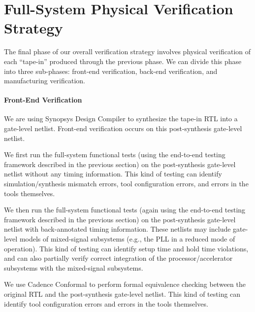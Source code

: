 
\section{Full-System Physical Verification Strategy}

The final phase of our overall verification strategy involves physical
verification of each ``tape-in'' produced through the previous phase. We
can divide this phase into three sub-phases: front-end verification,
back-end verification, and manufacturing verification.

\smallskip
\paragraph{Front-End Verification}
We are using Synopsys Design Compiler to synthesize the tape-in RTL into
a gate-level netlist. Front-end verification occurs on this
post-synthesis gate-level netlist.

\smallskip
\begin{cbxlist}{1.5em}{0em}{0.5em}

  \item {} We first run the
     full-system functional tests (using the end-to-end testing framework
     described in the previous section) on the post-synthesis gate-level
     netlist without any timing information. This kind of testing can
     identify simulation/synthesis mismatch errors, tool configuration
     errors, and errors in the tools themselves.

  \item {} We then run the
     full-system functional tests (again using the end-to-end testing
     framework described in the previous section) on the post-synthesis
     gate-level netlist with back-annotated timing information. These
     netlists may include gate-level models of mixed-signal subsystems
     (e.g., the PLL in a reduced mode of operation). This kind of testing
     can identify setup time and hold time violations, and can also
     partially verify correct integration of the processor/accelerator
     subsystems with the mixed-signal subsystems.

  \item {} We use Cadence Conformal to
     perform formal equivalence checking between the original RTL and the
     post-synthesis gate-level netlist. This kind of testing can identify
     tool configuration errors and errors in the tools themselves.

\end{cbxlist}

